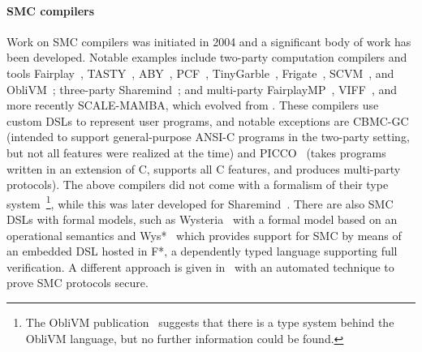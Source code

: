 \paragraph*{SMC compilers}
Work on SMC compilers was initiated in 2004 and a significant body of work has been developed. Notable examples include two-party computation compilers and tools Fairplay~\cite{Malkhi04}, TASTY~\cite{Henecka10}, ABY~\cite{Demmler15a}, PCF~\cite{Kreuter13}, TinyGarble~\cite{Songhori15}, Frigate~\cite{Mood16}, SCVM~\cite{Liu14}, and ObliVM~\cite{Liu15}; three-party Sharemind~\cite{Bogdanov08}; and multi-party FairplayMP~\cite{BenDavid08},  VIFF~\cite{DamgardGKN09}, and more recently SCALE-MAMBA, which evolved from \cite{BendlinDOZ11,DamgardPSZ12,NielsenNOB12}.
These compilers use custom DSLs to represent user programs, and notable exceptions are CBMC-GC~\cite{Holzer12} (intended to support general-purpose ANSI-C programs in the two-party setting, but not all features were realized at the time) and PICCO~\cite{Zhang13,Zhang18} (takes programs written in an extension of C, supports all C features, and produces multi-party protocols).
%
The above compilers did not come with a formalism of their type
system~\footnote{The ObliVM publication~\cite{Liu15} suggests that
there is a type system behind the ObliVM language, but no further
information could be found.}, while this was later developed for
Sharemind~\cite{sokk16}. There are also SMC DSLs with formal models,
such as Wysteria~\cite{RastogiHH14} with a formal model based on an
operational semantics and Wys*~\cite{RastogiSH17} which provides
support for SMC by means of an embedded DSL hosted in F*, a
dependently typed language supporting full verification. A different
approach is given in~\cite{PettaiL15} with an automated technique to
prove SMC protocols secure.


